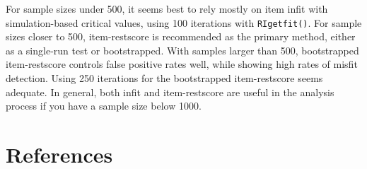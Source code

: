 \documentclass[
  letterpaper,
  DIV=11,
  numbers=noendperiod]{scrartcl}
\begin{document}
For sample sizes under 500, it seems best to rely mostly on item infit
with simulation-based critical values, using 100 iterations with
\texttt{RIgetfit()}. For sample sizes closer to 500, item-restscore is
recommended as the primary method, either as a single-run test or
bootstrapped. With samples larger than 500, bootstrapped item-restscore
controls false positive rates well, while showing high rates of misfit
detection. Using 250 iterations for the bootstrapped item-restscore
seems adequate. In general, both infit and item-restscore are useful in
the analysis process if you have a sample size below 1000.

\section*{References}\label{references}
\end{document}
